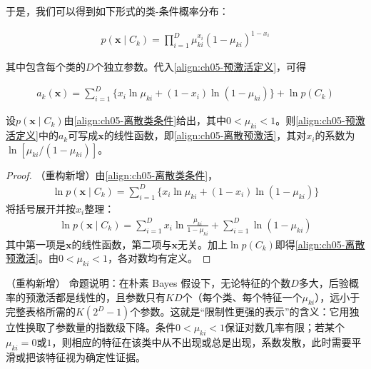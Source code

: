 \documentclass[../../main.tex]{subfiles}
\begin{document}
于是，我们可以得到如下形式的类-条件概率分布：

\begin{align}
  p(\boldsymbol{x}\mid C_k)=\prod_{i=1}^{D}\mu_{ki}^{x_i}(1-\mu_{ki})^{1-x_i}
  \label{align:ch05-离散类条件}
\end{align}

其中包含每个类的$D$个独立参数。代入\eqref{align:ch05-预激活定义}，可得

\begin{align}
  a_k(\boldsymbol{x})=\sum_{i=1}^{D}\bigl\{x_i\ln\mu_{ki}+(1-x_i)\ln(1-\mu_{ki})\bigr\}+\ln p(C_k)
  \label{align:ch05-离散预激活}
\end{align}

\begin{proposition}[离散特征的线性预激活]\label{proposition:ch05-离散线性预激活}
设$p(\boldsymbol{x}\mid C_k)$由\eqref{align:ch05-离散类条件}给出，其中$0<\mu_{ki}<1$。则\eqref{align:ch05-预激活定义}中的$a_k$可写成$\boldsymbol{x}$的线性函数，即\eqref{align:ch05-离散预激活}，其对$x_i$的系数为$\ln[\mu_{ki}/(1-\mu_{ki})]$。
\end{proposition}

\begin{proof}
（重构新增）由\eqref{align:ch05-离散类条件}，
\begin{align}
  \ln p(\boldsymbol{x}\mid C_k)=\sum_{i=1}^{D}\bigl\{x_i\ln\mu_{ki}+(1-x_i)\ln(1-\mu_{ki})\bigr\}
\end{align}
将括号展开并按$x_i$整理：
\begin{align}
  \ln p(\boldsymbol{x}\mid C_k)=\sum_{i=1}^{D}x_i\ln\frac{\mu_{ki}}{1-\mu_{ki}}+\sum_{i=1}^{D}\ln(1-\mu_{ki})
\end{align}
其中第一项是$\boldsymbol{x}$的线性函数，第二项与$\boldsymbol{x}$无关。加上$\ln p(C_k)$即得\eqref{align:ch05-离散预激活}。由$0<\mu_{ki}<1$，各对数均有定义。
\end{proof}

\begin{remark}（重构新增）
命题说明：在朴素 Bayes 假设下，无论特征的个数$D$多大，后验概率的预激活都是线性的，且参数只有$KD$个（每个类、每个特征一个$\mu_{ki}$），远小于完整表格所需的$K(2^{D}-1)$个参数。这就是“限制性更强的表示”的含义：它用独立性换取了参数量的指数级下降。条件$0<\mu_{ki}<1$保证对数几率有限；若某个$\mu_{ki}=0$或$1$，则相应的特征在该类中从不出现或总是出现，系数发散，此时需要平滑或把该特征视为确定性证据。
\end{remark}
\end{document}
